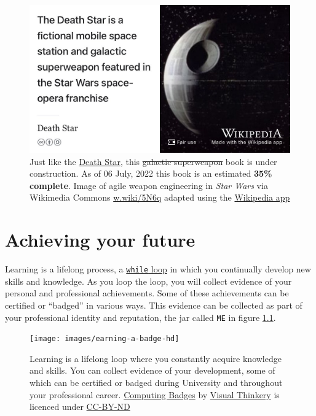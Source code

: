 \documentclass[
]{book}
\begin{document}
\begin{figure}

{\centering \includegraphics[width=0.99\linewidth]{images/DeathStar2} 

}

\caption{Just like the \href{https://en.wikipedia.org/wiki/Death_Star}{Death Star}, this \sout{galactic superweapon} book is under construction. As of 06 July, 2022 this book is an estimated \textbf{35\% complete}. Image of agile weapon engineering in \emph{Star Wars} via Wikimedia Commons \href{https://w.wiki/5N6q}{w.wiki/5N6q} adapted using the \href{https://apps.apple.com/gb/app/wikipedia/id324715238}{Wikipedia app}}\label{fig:deathstar7-fig}
\end{figure}

\hypertarget{achieving}{%
\chapter{Achieving your future}\label{achieving}}

Learning is a lifelong process, a \href{https://en.wikipedia.org/wiki/While_loop}{\texttt{while} loop} in which you continually develop new skills and knowledge. As you loop the loop, you will collect evidence of your personal and professional achievements. Some of these achievements can be certified or ``badged'' in various ways. This evidence can be collected as part of your professional identity and reputation, the jar called \texttt{ME} in figure \ref{fig:while-learning-fig}.

\begin{figure}

{\centering \texttt{[image: images/earning-a-badge-hd]} 

}

\caption{Learning is a lifelong loop where you constantly acquire knowledge and skills. You can collect evidence of your development, some of which can be certified or badged during University and throughout your professional career. \href{https://bryanmmathers.com/computing-badges/}{Computing Badges} by \href{https://visualthinkery.com/}{Visual Thinkery} is licenced under \href{https://creativecommons.org/licenses/by-nd/4.0/}{CC-BY-ND}}\label{fig:while-learning-fig}
\end{figure}
\end{document}

